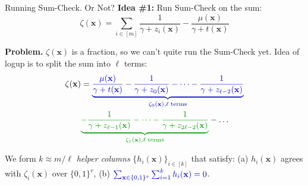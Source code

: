 \documentclass{zkdl-presentation-template}
\begin{document}
    \begin{frame}{Running Sum-Check. Or Not?}
        \textbf{Idea \#1:} Run Sum-Check on the sum:
        \begin{equation*}
            \zeta(\mathbf{x}) = \sum_{i \in [m]} \frac{1}{\gamma + z_i(\mathbf{x})} - \frac{\mu(\mathbf{x})}{\gamma+t(\mathbf{x})}
        \end{equation*}

        \vspace{-15px}

        \textcolor{red!70!black}{\textbf{Problem.}} $\zeta(\mathbf{x})$ is
        a fraction, so we can't quite run the Sum-Check yet.  \hspace{0.5px} Idea of logup is to
        split the sum into $\ell$ terms:
        \begin{align*}
            \zeta(\mathbf{x}) &= \textcolor{blue!80!black}{\underbrace{\frac{\mu(\mathbf{x})}{\gamma+t(\mathbf{x})} - \frac{1}{\gamma+z_0(\mathbf{x})} - \dots - \frac{1}{\gamma+z_{\ell-2}(\mathbf{x})}}_{\zeta_0(\mathbf{x}), \ell \; \text{terms}}}\\
            & \textcolor{green!60!black}{\underbrace{- \frac{1}{\gamma+z_{\ell-1}(\mathbf{x})} - \dots - \frac{1}{\gamma + z_{2\ell-2}(\mathbf{x})}}_{\zeta_1(\mathbf{x}), \ell \; \text{terms}}} - \dots 
        \end{align*}

        \vspace{-15px}

         We form $k \approx m/\ell$ \textit{helper columns}
        $\{h_i(\mathbf{x})\}_{i \in [k]}$ that satisfy: (a) $h_i(\mathbf{x})$
        agrees with $\zeta_i(\mathbf{x})$ over $\{0,1\}^v$, (b)
        $\textcolor{blue!70!black}{\sum_{\mathbf{x} \in \{0,1\}^v}\sum_{i=1}^k h_i(\mathbf{x}) = 0}$.
    \end{frame}
\end{document}
